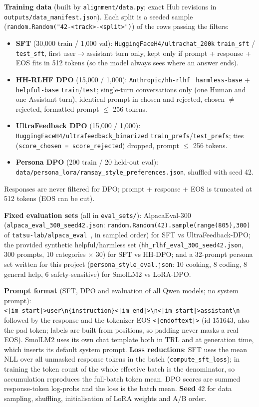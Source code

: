 \documentclass[10pt]{article}
\newcommand{\fp}[1]{\nolinkurl{#1}}
\begin{document}
\textbf{Training data} (built by \fp{alignment/data.py}; exact Hub revisions in \fp{outputs/data_manifest.json}).
Each split is a seeded sample (\texttt{random.Random("42-<track>-<split>")}) of the rows passing the filters:
\begin{itemize}
\item \textbf{SFT} (30,000 train / 1,000 val): \texttt{HuggingFaceH4/ultrachat\_200k} \texttt{train\_sft} /
  \texttt{test\_sft}, first user$\to$assistant turn only, kept only if prompt + response + EOS fits in 512 tokens
  (so the model always sees where an answer ends).
\item \textbf{HH-RLHF DPO} (15,000 / 1,000): \texttt{Anthropic/hh-rlhf}~\cite{hh} \texttt{harmless-base} + \texttt{helpful-base}
  \texttt{train}/\texttt{test}; single-turn conversations only (one Human and one Assistant turn), identical
  prompt in chosen and rejected, chosen $\neq$ rejected, formatted prompt $\le$ 256 tokens.
\item \textbf{UltraFeedback DPO} (15,000 / 1,000): \texttt{HuggingFaceH4/ultrafeedback\_binarized}
  \texttt{train\_prefs}/\texttt{test\_prefs}; ties (\texttt{score\_chosen = score\_rejected}) dropped, prompt $\le$ 256 tokens.
\item \textbf{Persona DPO} (200 train / 20 held-out eval): \fp{data/persona_lora/ramsay_style_preferences.json},
  shuffled with seed 42.
\end{itemize}
Responses are never filtered for DPO; prompt + response + EOS is truncated at 512 tokens (EOS can be cut).

\textbf{Fixed evaluation sets} (all in \fp{eval_sets/}):
AlpacaEval-300 (\fp{alpaca_eval_300_seed42.json}: \fp{random.Random(42).sample(range(805),300)} of
\texttt{tatsu-lab/alpaca\_eval}~\cite{alpaca}, in sampled order) for SFT vs UltraFeedback-DPO;
the provided synthetic helpful/harmless set (\fp{hh_rlhf_eval_300_seed42.json}, 300 prompts, 10 categories
$\times$ 30) for SFT vs HH-DPO; and a 32-prompt persona set written for this project
(\fp{persona_style_eval.json}: 10 cooking, 8 coding, 8 general help, 6 safety-sensitive) for SmolLM2 vs LoRA-DPO.

\textbf{Prompt format} (SFT, DPO and evaluation of all Qwen models; no system prompt):\\
\hspace*{1.2em}\texttt{<|im\_start|>user\textbackslash n\{instruction\}<|im\_end|>\textbackslash n<|im\_start|>assistant\textbackslash n}\\
followed by the response and the tokenizer EOS \texttt{<|endoftext|>} (id 151643, also the pad token; labels are
built from positions, so padding never masks a real EOS). SmolLM2 uses its own chat template both in TRL and at
generation time, which inserts its default system prompt. \textbf{Loss reductions}: SFT uses the mean NLL over all unmasked response tokens in the batch (\fp{compute_sft_loss}); in training the token count of the whole effective batch is the denominator, so accumulation reproduces the full-batch token mean. DPO scores are summed response-token log-probs and the loss is the batch mean. \textbf{Seed} 42 for data sampling, shuffling,
initialisation of LoRA weights and A/B order.
\end{document}
